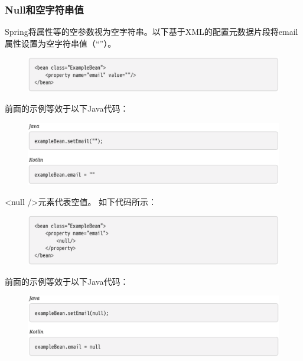 \newpage
\subsubsection{Null和空字符串值}
Spring将属性等的空参数视为空字符串。以下基于XML的配置元数据片段将email属性设置为空字符串值（“”）。

\begin{figure}[ht]
    \centering
    \includegraphics[width=1\linewidth]{./Figure/IMG_code_46.png}
\end{figure}

前面的示例等效于以下Java代码：

\begin{figure}[ht]
    \centering
    \includegraphics[width=1\linewidth]{./Figure/IMG_code_47.png}
\end{figure}

<null />元素代表空值。 如下代码所示：

\begin{figure}[ht]
    \centering
    \includegraphics[width=1\linewidth]{./Figure/IMG_code_48.png}
\end{figure}

\newpage
前面的示例等效于以下Java代码：

\begin{figure}[ht]
    \centering
    \includegraphics[width=1\linewidth]{./Figure/IMG_code_49.png}
\end{figure}

